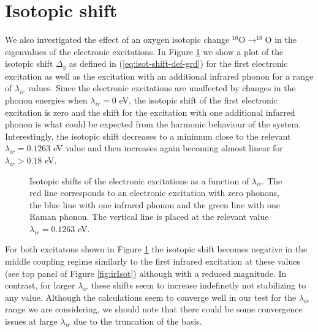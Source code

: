 \section{Isotopic shift}
\label{sec:elIsotShift}

We also investigated the effect of an oxygen isotopic change $^{16}$O$\rightarrow ^{18}$O in the eigenvalues of the electronic excitations.
In Figure \ref{fig:electrIsot} we show a plot of the isotopic shift $\Delta_g$ as defined in (\ref{eq:isot-shift-def-grd}) for the first electronic excitation as well as the excitation with an additional infrared phonon for a range of $\lambda_{ir}$ values.
Since the electronic excitations are unaffected by changes in the phonon energies when $\lambda_{ir}=0$ eV, the isotopic shift of the first electronic excitation is zero and the shift for the excitation with one additional infarred phonon is what could be expected from the harmonic behaviour of the system.
Interestingly, the isotopic shift decreases to a minimum close to the relevant $\lambda_{ir}=0.1263$ eV value and then increases again becoming almost linear for $\lambda_{ir}>0.18$ eV.
%
\begin{figure}[ht]
  \centering
  
  \caption[Isotopic shift of the electronic excitations as a function of $\lambda_{ir}$.]
  {Isotopic shifts of the electronic excitations as a function of $\lambda_{ir}$. 
    The red line corresponds to an electronic excitation with zero phonons, the blue line with one infrared phonon and the green line with one Raman phonon.
    The vertical line is placed at the relevant value $\lambda_{ir}=0.1263$ eV.}
  \label{fig:electrIsot}
\end{figure}

For both excitatons shown in Figure \ref{fig:electrIsot} the isotopic shift becomes negative in the middle coupling regime similarly to the first infrared excitation at these values (see top panel of Figure \ref{fig:irIsot}) although with a reduced magnitude.
In contrast, for larger $\lambda_{ir}$ these shifts seem to increase indefinetly not stabilizing to any value.
Although the calculations seem to converge well in our test for the $\lambda_{ir}$ range we are considering, we should note that there could be some convergence issues at large $\lambda_{ir}$ due to the truncation of the basis.